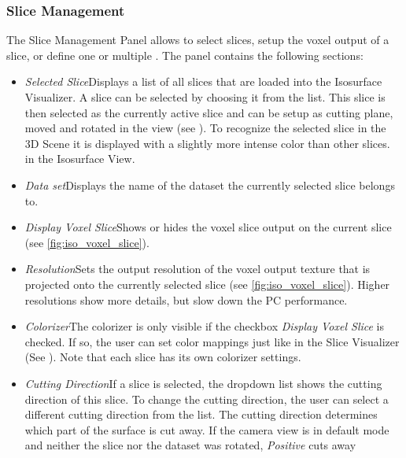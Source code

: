 \subsubsection{Slice Management}\label{sec:slicemanagement}
The Slice Management Panel allows to select slices, setup the voxel output of a slice, or define one or multiple .
The panel contains the following sections:
\begin{itemize}
  \item{\emph{Selected Slice}\newline Displays a list of all slices that are loaded into the Isosurface Visualizer.
  A slice can be selected by choosing it from the list. This slice is then selected as the currently active slice and
  can be setup as cutting plane, moved and rotated in the view (see ). To recognize the selected slice in the 3D Scene it is displayed with a slightly more intense color than other slices.
  in the Isosurface View.}
  \item{\emph{Data set}\newline Displays the name of the dataset the currently selected slice belongs to.}
  \item{\emph{Display Voxel Slice}\newline Shows or hides the voxel slice output on the current slice (see \autoref{fig:iso_voxel_slice}).}
  \item{\emph{Resolution}\newline Sets the output resolution of the voxel output texture that is projected onto the
  currently selected slice (see \autoref{fig:iso_voxel_slice}).
  Higher resolutions show more details, but slow down the PC performance.}
  \item{\emph{Colorizer}\newline The colorizer is only visible if the checkbox \emph{Display Voxel Slice} is checked.
  If so, the user can set color mappings just like in the Slice Visualizer (See ).
  Note that each slice has its own colorizer settings.}
  \item{\emph{Cutting Direction}\newline If a slice is selected, the dropdown list shows the cutting direction of this slice.
  To change the cutting direction, the user can select a different cutting direction from the list.
  The cutting direction determines which part of the surface is cut away.
  If the camera view is in default mode and neither the slice nor the dataset was rotated, \emph{Positive} cuts away
}
\end{itemize}
